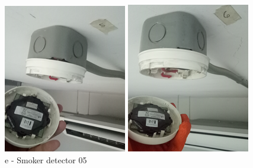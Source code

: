 \begin{figure}[h]
\begin{minipage}[b]{0.22\linewidth}
		\includegraphics[width=\textwidth]{figures/ch05_fdas_sd05}
		\caption*{e - Smoker detector 05}
	\end{minipage}
	\hspace{0.03cm}
	\begin{minipage}[b]{0.22\linewidth}
		\centering
		\includegraphics[width=\textwidth]{figures/ch05_fdas_sd06}

\end{minipage}
\end{figure}
